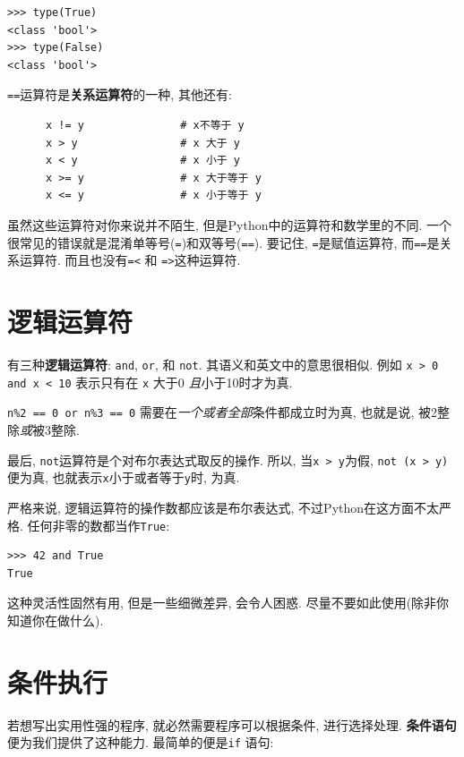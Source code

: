 \documentclass[10pt]{book}
\begin{document}
\begin{verbatim}
>>> type(True)
<class 'bool'>
>>> type(False)
<class 'bool'>
\end{verbatim}
%
 {\tt ==}运算符是{\bf 关系运算符}的一种, 其他还有:

\begin{verbatim}
      x != y               # x不等于 y
      x > y                # x 大于 y
      x < y                # x 小于 y
      x >= y               # x 大于等于 y
      x <= y               # x 小于等于 y
\end{verbatim}
%
虽然这些运算符对你来说并不陌生, 但是Python中的运算符和数学里的不同. 
一个很常见的错误就是混淆单等号({\tt =})和双等号({\tt ==}). 
要记住, {\tt =}是赋值运算符, 而{\tt ==}是关系运算符. 
而且也没有{\tt =<} 和 {\tt =>}这种运算符. 


\section {逻辑运算符}

有三种{\bf 逻辑运算符}: {\tt and}, {\tt or}, 和 {\tt not}.
其语义和英文中的意思很相似. 例如
{\tt x > 0 and x < 10} 表示只有在 {\tt x} 大于0 {\em 且}小于10时才为真.

{\tt n\%2 == 0 or n\%3 == 0} 需要在{\em 一个或者全部}条件都成立时为真, 
也就是说, 被2整除{\em 或}被3整除. 

最后, {\tt not}运算符是个对布尔表达式取反的操作. 
所以, 当{\tt x > y}为假,  {\tt not (x > y)}便为真, 
也就表示{\tt x}小于或者等于{\tt y}时, 为真.

严格来说, 逻辑运算符的操作数都应该是布尔表达式, 不过Python在这方面不太严格. 
任何非零的数都当作{\tt True}:

\begin{verbatim}
>>> 42 and True
True
\end{verbatim}
%
这种灵活性固然有用, 但是一些细微差异, 会令人困惑. 
尽量不要如此使用(除非你知道你在做什么).


\section{条件执行}
\label{conditional.execution}

若想写出实用性强的程序, 就必然需要程序可以根据条件, 进行选择处理. 
{\bf 条件语句} 便为我们提供了这种能力. 
最简单的便是{\tt if} 语句:
\end{document}
